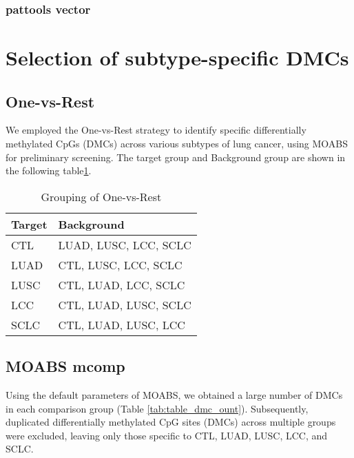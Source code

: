 \documentclass[10pt]{article}
\begin{document}
\subsubsection{pattools vector}

\section{Selection of subtype-specific DMCs}\label{sec:selection-of-dmcs}

\subsection{One-vs-Rest}

We employed the One-vs-Rest strategy to identify specific differentially methylated CpGs (DMCs) across various
subtypes of lung cancer, using MOABS\cite{sun_moabs_2014} for preliminary screening. The target group and Background
group are shown in the following table\ref*{tab:grouping}.

\begin{table}[htbp]
    \begin{center}
        \caption{ Grouping of One-vs-Rest }
        \begin{tabular}{|l|l|}
            \hline
            Target & Background            \\
            \hline
            CTL    & LUAD, LUSC, LCC, SCLC \\
            LUAD   & CTL, LUSC, LCC, SCLC  \\
            LUSC   & CTL, LUAD, LCC, SCLC  \\
            LCC    & CTL, LUAD, LUSC, SCLC \\
            SCLC   & CTL, LUAD, LUSC, LCC  \\
            \hline
        \end{tabular}
    \end{center}
    \label{tab:grouping}

\end{table}

\subsection{MOABS mcomp}

Using the default parameters of MOABS, we obtained a large number of DMCs in each comparison group (Table \ref{tab:table_dmc_ount}).
Subsequently, duplicated differentially methylated CpG sites (DMCs) across multiple groups were excluded, leaving
only those specific to CTL, LUAD, LUSC, LCC, and SCLC.
\end{document}
